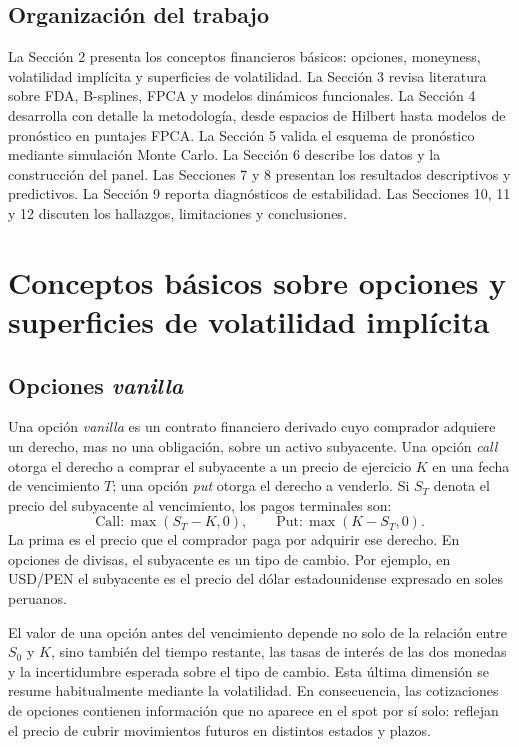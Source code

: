\documentclass[a4paper,11pt]{article}
\begin{document}
\subsection{Organización del trabajo}

La Sección 2 presenta los conceptos financieros básicos: opciones, moneyness, volatilidad implícita y superficies de volatilidad. La Sección 3 revisa literatura sobre FDA, B-splines, FPCA y modelos dinámicos funcionales. La Sección 4 desarrolla con detalle la metodología, desde espacios de Hilbert hasta modelos de pronóstico en puntajes FPCA. La Sección 5 valida el esquema de pronóstico mediante simulación Monte Carlo. La Sección 6 describe los datos y la construcción del panel. Las Secciones 7 y 8 presentan los resultados descriptivos y predictivos. La Sección 9 reporta diagnósticos de estabilidad. Las Secciones 10, 11 y 12 discuten los hallazgos, limitaciones y conclusiones.

\section{Conceptos básicos sobre opciones y superficies de volatilidad implícita}

\subsection{Opciones \emph{vanilla}}

Una opción \emph{vanilla} es un contrato financiero derivado cuyo comprador adquiere un derecho, mas no una obligación, sobre un activo subyacente. Una opción \emph{call} otorga el derecho a comprar el subyacente a un precio de ejercicio \(K\) en una fecha de vencimiento \(T\); una opción \emph{put} otorga el derecho a venderlo. Si \(S_T\) denota el precio del subyacente al vencimiento, los pagos terminales son:
\[
  \text{Call}: \max(S_T-K,0),\qquad
  \text{Put}: \max(K-S_T,0).
\]
La prima es el precio que el comprador paga por adquirir ese derecho. En opciones de divisas, el subyacente es un tipo de cambio. Por ejemplo, en USD/PEN el subyacente es el precio del dólar estadounidense expresado en soles peruanos.

El valor de una opción antes del vencimiento depende no solo de la relación entre \(S_0\) y \(K\), sino también del tiempo restante, las tasas de interés de las dos monedas y la incertidumbre esperada sobre el tipo de cambio. Esta última dimensión se resume habitualmente mediante la volatilidad. En consecuencia, las cotizaciones de opciones contienen información que no aparece en el spot por sí solo: reflejan el precio de cubrir movimientos futuros en distintos estados y plazos.
\end{document}
